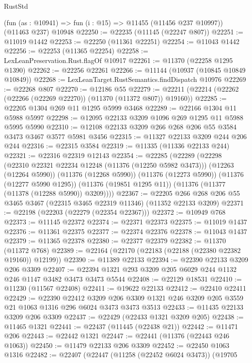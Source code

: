 \begin{lexlean}{RustStd}
\begin{coremodule}
{{{{{{{{{{{{{{{{{{{    (fun (as : @10941) => fun (i : @15) => @11455 (@11456 @237 @10997))
    (@11463 @237)
    @10948
@22250 := @22235 (@11145 (@22247 @807))
@22251 := @11019 @1442
@22253 := @22250 (@11361 @22251)
@22254 := @11043 @1442
@22256 := @22253 (@11365 @22254)
@22258 := LexLeanPreservation.Rust.flagOf @10917
@22261 := @11370 (@22258 @1295 @1390)
@22262 := @22256 @22261
@22266 := @11144 (@10937 (@10845 @10849 @10849))
@22268 := LexLeanTarget.RustSemantics.findDispatch @10976
@22269 := @22268 @807
@22270 := @12186 @55
@22279 := @22211 (@22214 (@22262 (@22266 (@22269 @22270)) (@11370 (@11372 @807)) @19160))
@22285 := @22205 @1304 @269 @11 @1295 @5999 @3468
@22289 := @22166 @1304 @11 @5988 @5997
@22298 := @12095 @22133 @3209 @1096 @269 @1295 @11 @5988 @5995 @5990
@22310 := @12108 @22133 @3209 @266 @268 @206 @55 @3584 @3473 @3467 @3577 @5981 @3456
@22315 := @11327 @22133 @3209 @244 @206 @244
@22316 := @22315 @3584
@22319 := @11335 (@11336 @22133 @244)
@22321 := @22316 @22319 @12143
@22354 := @22285
    (@22289
      (@22298
        (@22310 @22321 @22234 @12248 (@11376 (@12250 @5982 @3473)))
        (@12263 (@12264 @5990))
        (@11376 (@12268 @5990))
        (@11376 (@12273 @5990))
        (@11376 (@12277 @5990 @1295))
        (@11376 (@19851 @1295 @11))
        (@11376 (@11377 (@11378 (@12288 @5990)) @3209))))
@22367 := @22205 @266 @268 @206 @55 @3465 @3467 (@22315 @3465 @22319 @11346) (@11352 @22133 @3209)
@22371 := @22198 (@22203 (@22279 (@22354 @22367)))
@22372 := @10949 @768
@22373 := @11145 @22372
@22374 := @22371 @22373
@22375 := @11019 @1437
@22376 := @11361 @22375
@22377 := @22374 @22376
@22378 := @11043 @1437
@22379 := @11365 @22378
@22380 := @22377 @22379
@22382 := @11370 (@11372 @768)
@22389 := @22164 (@22170 (@22183 (@22188 (@22380 @22382 @19160)) @12199))
@22390 := @11389 @22133
@22394 := @22390 @22133 @3209 @206 @3309
@22407 := @22394 @1321 @293 @3209 @205 @6029 @244 @1132 @246 @1147 @3482 @3473 @3473 @5544
@22408 := @22129 @18531
@22410 := @11230 (@11567 @22408)
@22411 := @19622 @22133
@22412 := @22410 @22411
@22429 := @22390
    @22412
    @3209
    @206
    @3309
    @1321
    @246
    @3209
    @205
    @3559
    @21
    @1063
    @1316
    @296
    @6024
    @3473
    @3473
    @3513
@22433 := @11435 @22133 @3209 @206 @3309
@22437 := @22429 (@22433 @1321 @3209 @205)
@22438 := @11465 @1321
@22441 := @22437 (@11445 (@22438 @21))
@22442 := @11471 @206
@22443 := @22442 @1321
@22447 := @22441 (@11376 (@22443 @246 @1063))
@22450 := @11479 @22133 @206 @3309
@22452 := @22450 @1063 @1316
@22482 := @22407
    (@22447
      (@11258 (@22452 @6024 @3473))
      (@19705
}}}}}}}}}}}}}}}}}}}
\end{coremodule}
\end{lexlean}
